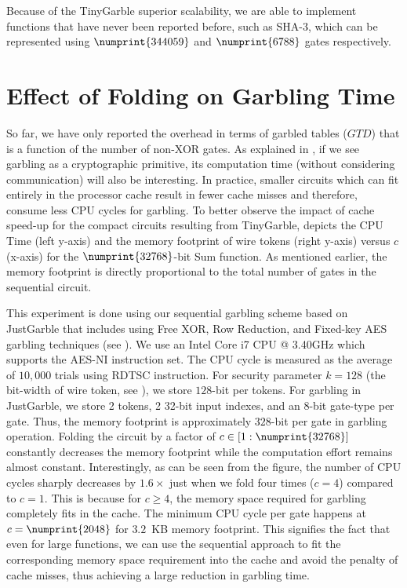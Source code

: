 Because of the TinyGarble superior scalability, we are able to implement functions that have never been reported before, such as SHA-3, which can be represented using $\numprint{344059}$ and $\numprint{6788}$ gates respectively.

\section{Effect of Folding on Garbling Time}
So far, we have only reported the overhead in terms of garbled tables ($\mathit{GTD}$) that is a function of the number of non-XOR gates.
As explained in \cite{bellare2013efficient}, if we see garbling as a cryptographic primitive, its computation time (without considering communication) will also be interesting.
In practice, smaller circuits which can fit entirely in the processor cache result in fewer cache misses and therefore, consume less CPU cycles for garbling.
To better observe the impact of cache speed-up for the compact circuits resulting from TinyGarble,  depicts the CPU Time (left y-axis) and the memory footprint of wire tokens (right y-axis) versus $c$ (x-axis) for the $\numprint{32768}$-bit Sum function.
As mentioned earlier, the memory footprint is directly proportional to the total number of gates in the sequential circuit.

This experiment is done using our sequential garbling scheme based on JustGarble \cite{bellare2013efficient} that includes using Free XOR, Row Reduction, and Fixed-key AES garbling techniques (see ).
We use an Intel Core i7 CPU @ 3.40GHz which supports the AES-NI instruction set.
The CPU cycle is measured as the average of $10,000$ trials using RDTSC instruction.
For security parameter $k=128$ (the bit-width of wire token, see ), we store $128$-bit per tokens.
For garbling in JustGarble, we store 2 tokens, 2 32-bit input indexes, and an 8-bit gate-type per gate.
Thus, the memory footprint is approximately $328$-bit per gate in garbling operation.
Folding the circuit by a factor of $c \in [1:\numprint{32768}]$ constantly decreases the memory footprint while the computation effort remains almost constant.
Interestingly, as can be seen from the figure, the number of CPU cycles sharply decreases by $1.6\times$ just when we fold four times ($c=4$) compared to $c=1$.
This is because for $c \geq 4$, the memory space required for garbling completely fits in the cache.
The minimum CPU cycle per gate happens at $c=\numprint{2048}$ for $3.2$~KB memory footprint.
This signifies the fact that even for large functions, we can use the sequential approach to fit the corresponding memory space requirement into the cache and avoid the penalty of cache misses, thus achieving a large reduction in garbling time.

